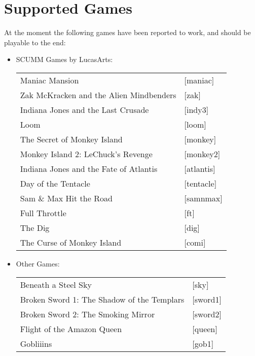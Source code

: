 


\section{Supported Games}

At the moment the following games have been reported to work, and should
be playable to the end:

\begin{itemize}
\item SCUMM Games by LucasArts:\\
  \begin {tabular} [h] {ll}
    Maniac Mansion&                                [maniac]\\
    Zak McKracken and the Alien Mindbenders&       [zak]\\
    Indiana Jones and the Last Crusade&            [indy3]\\
    Loom&                                          [loom]\\
    The Secret of Monkey Island&                   [monkey]\\
    Monkey Island 2: LeChuck's Revenge&            [monkey2]\\
    Indiana Jones and the Fate of Atlantis&        [atlantis]\\
    Day of the Tentacle&                           [tentacle]\\
    Sam \& Max Hit the Road&                       [samnmax]\\
    Full Throttle&                                 [ft]\\
    The Dig&                                       [dig]\\
    The Curse of Monkey Island&                    [comi]\\
  \end{tabular}
\item Other Games:\\ 
  \begin{tabular}[h]{ll}
    Beneath a Steel Sky&                           [sky]\\
    Broken Sword 1: The Shadow of the Templars&    [sword1]\\
    Broken Sword 2: The Smoking Mirror&            [sword2]\\
    Flight of the Amazon Queen&                    [queen]\\
    Gobliiins&                                     [gob1]\\

\end{tabular}
\end{itemize}
